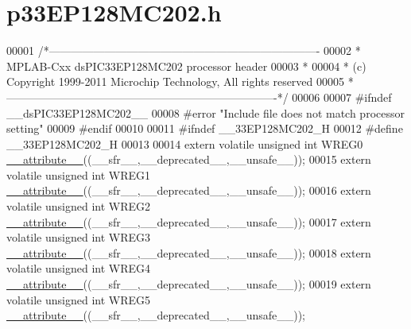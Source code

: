 \hypertarget{a00015_source}{\section{p33\+E\+P128\+M\+C202.\+h}
\label{a00015_source}
}

\begin{DoxyCode}
00001 \textcolor{comment}{/*-------------------------------------------------------------------------}
00002 \textcolor{comment}{ * MPLAB-Cxx  dsPIC33EP128MC202 processor header}
00003 \textcolor{comment}{ *}
00004 \textcolor{comment}{ * (c) Copyright 1999-2011 Microchip Technology, All rights reserved}
00005 \textcolor{comment}{ *-------------------------------------------------------------------------*/}
00006 
00007 \textcolor{preprocessor}{#ifndef \_\_dsPIC33EP128MC202\_\_}
00008 \textcolor{preprocessor}{#error "Include file does not match processor setting"}
00009 \textcolor{preprocessor}{#endif}
00010 
00011 \textcolor{preprocessor}{#ifndef \_\_33EP128MC202\_H}
00012 \textcolor{preprocessor}{#define \_\_33EP128MC202\_H}
00013 
00014 \textcolor{keyword}{extern} \textcolor{keyword}{volatile} \textcolor{keywordtype}{unsigned} \textcolor{keywordtype}{int}  WREG0 \hyperlink{a00015_a493c46f03454991ccc5aa7a6e1dfb2a7}{\_\_attribute\_\_}((\_\_sfr\_\_,\_\_deprecated\_\_,\_\_unsafe\_\_));
00015 \textcolor{keyword}{extern} \textcolor{keyword}{volatile} \textcolor{keywordtype}{unsigned} \textcolor{keywordtype}{int}  WREG1 \hyperlink{a00015_a493c46f03454991ccc5aa7a6e1dfb2a7}{\_\_attribute\_\_}((\_\_sfr\_\_,\_\_deprecated\_\_,\_\_unsafe\_\_));
00016 \textcolor{keyword}{extern} \textcolor{keyword}{volatile} \textcolor{keywordtype}{unsigned} \textcolor{keywordtype}{int}  WREG2 \hyperlink{a00015_a493c46f03454991ccc5aa7a6e1dfb2a7}{\_\_attribute\_\_}((\_\_sfr\_\_,\_\_deprecated\_\_,\_\_unsafe\_\_));
00017 \textcolor{keyword}{extern} \textcolor{keyword}{volatile} \textcolor{keywordtype}{unsigned} \textcolor{keywordtype}{int}  WREG3 \hyperlink{a00015_a493c46f03454991ccc5aa7a6e1dfb2a7}{\_\_attribute\_\_}((\_\_sfr\_\_,\_\_deprecated\_\_,\_\_unsafe\_\_));
00018 \textcolor{keyword}{extern} \textcolor{keyword}{volatile} \textcolor{keywordtype}{unsigned} \textcolor{keywordtype}{int}  WREG4 \hyperlink{a00015_a493c46f03454991ccc5aa7a6e1dfb2a7}{\_\_attribute\_\_}((\_\_sfr\_\_,\_\_deprecated\_\_,\_\_unsafe\_\_));
00019 \textcolor{keyword}{extern} \textcolor{keyword}{volatile} \textcolor{keywordtype}{unsigned} \textcolor{keywordtype}{int}  WREG5 \hyperlink{a00015_a493c46f03454991ccc5aa7a6e1dfb2a7}{\_\_attribute\_\_}((\_\_sfr\_\_,\_\_deprecated\_\_,\_\_unsafe\_\_));

\end{DoxyCode}
